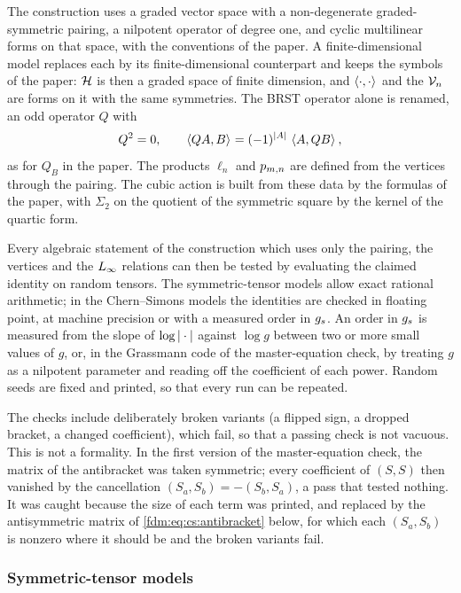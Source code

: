 The construction uses a graded vector space with a non-degenerate graded-symmetric pairing, a nilpotent operator of degree one, and cyclic multilinear forms on that space, with the conventions of the paper.
A finite-dimensional model replaces each by its finite-dimensional counterpart and keeps the symbols of the paper: $\mathcal{H}$ is then a graded space of finite dimension, and $\braket{\cdot, \cdot}_{}$ and the $\mathcal{V}_{n}$ are forms on it with the same symmetries.
The BRST operator alone is renamed, an odd operator $Q$ with
\begin{equation}
  \label{fdm:eq:fm:Q}
  Q^2
    = 0,
  \qquad
  \braket{QA, B}_{}
    = (-1)^{{|A|}} \, \braket{A, QB}_{},
\end{equation}
as for $Q_B$ in the paper.
The products $\ell_n$ and $p_{m,n}$ are defined from the vertices through the pairing.
The cubic action is built from these data by the formulas of the paper, with $\Sigma_2$ on the quotient of the symmetric square by the kernel of the quartic form.

Every algebraic statement of the construction which uses only the pairing, the vertices and the $L_\infty$ relations can then be tested by evaluating the claimed identity on random tensors.
The symmetric-tensor models allow exact rational arithmetic; in the Chern--Simons models the identities are checked in floating point, at machine precision or with a measured order in $g_s$.
An order in $g_s$ is measured from the slope of $\log {|\cdot|}$ against $\log g$ between two or more small values of $g$, or, in the Grassmann code of the master-equation check, by treating $g$ as a nilpotent parameter and reading off the coefficient of each power.
Random seeds are fixed and printed, so that every run can be repeated.

The checks include deliberately broken variants (a flipped sign, a dropped bracket, a changed coefficient), which fail, so that a passing check is not vacuous.
This is not a formality.
In the first version of the master-equation check, the matrix of the antibracket was taken symmetric; every coefficient of $(S, S)$ then vanished by the cancellation $(S_a, S_b) = - (S_b, S_a)$, a pass that tested nothing.
It was caught because the size of each term was printed, and replaced by the antisymmetric matrix of \cref{fdm:eq:cs:antibracket} below, for which each $(S_a, S_b)$ is nonzero where it should be and the broken variants fail.

\subsubsection{Symmetric-tensor models}
\label{fdm:sec:general:symmetric}

